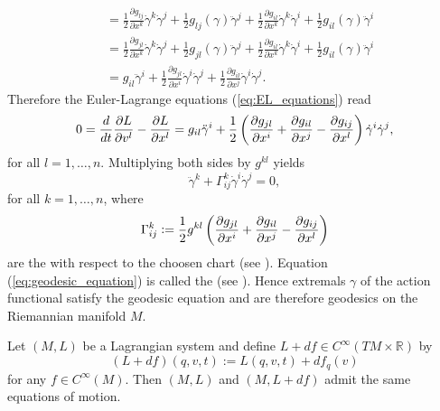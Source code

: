 \begin{example}
\begin{align*}
		&= \frac{1}{2}\frac{\partial g_{lj}}{\partial x^k}\dot{\gamma}^k\dot{\gamma}^j + \frac{1}{2}g_{lj}(\gamma)\ddot{\gamma}^j + \frac{1}{2}\frac{\partial g_{il}}{\partial x^k}\dot{\gamma}^k\dot{\gamma}^i + \frac{1}{2}g_{il}(\gamma)\ddot{\gamma}^i\\
		&= \frac{1}{2}\frac{\partial g_{jl}}{\partial x^k}\dot{\gamma}^k\dot{\gamma}^j + \frac{1}{2}g_{jl}(\gamma)\ddot{\gamma}^j + \frac{1}{2}\frac{\partial g_{il}}{\partial x^k}\dot{\gamma}^k\dot{\gamma}^i + \frac{1}{2}g_{il}(\gamma)\ddot{\gamma}^i\\
		&= g_{il}\ddot{\gamma}^i + \frac{1}{2}\frac{\partial g_{jl}}{\partial x^i}\dot{\gamma}^i\dot{\gamma}^j + \frac{1}{2}\frac{\partial g_{il}}{\partial x^j}\dot{\gamma}^i\dot{\gamma}^j.
	\end{align*}
	Therefore the Euler-Lagrange equations (\ref{eq:EL_equations}) read
	\begin{equation*}
		0 = \frac{d}{dt}\frac{\partial L}{\partial v^l} - \frac{\partial L}{\partial x^l} = g_{il}\ddot{\gamma}^i + \frac{1}{2}\del[3]{\frac{\partial g_{jl}}{\partial x^i} + \frac{\partial g_{il}}{\partial x^j} - \frac{\partial g_{ij}}{\partial x^l}}\dot{\gamma}^i\dot{\gamma}^j,	
	\end{equation*}
	\noindent for all $l = 1,\dots,n$. Multiplying both sides by $g^{kl}$ yields
	\begin{equation}
		\label{eq:geodesic_equation}
		\ddot{\gamma}^k + \Gamma^k_{ij}\dot{\gamma}^i \dot{\gamma}^j = 0,
	\end{equation}
	\noindent for all $k = 1,\dots,n$, where
	\begin{equation*}
		\Gamma^k_{ij} := \frac{1}{2}g^{kl}\del[3]{\frac{\partial g_{jl}}{\partial x^i} + \frac{\partial g_{il}}{\partial x^j} - \frac{\partial g_{ij}}{\partial x^l}}
	\end{equation*}
	\noindent are the  with respect to the choosen chart (see \cite[70]{lee:Riemannian_manifolds:1997}). Equation (\ref{eq:geodesic_equation}) is called the  (see \cite[58]{lee:Riemannian_manifolds:1997}). Hence extremals $\gamma$ of the action functional satisfy the geodesic equation and are therefore geodesics on the Riemannian manifold $M$.
\end{example}

\begin{lemma}
	\label{lem:same_equations_of_motion}
	Let $(M,L)$ be a Lagrangian system and define $L + df \in C^\infty(TM \times \mathbb{R})$ by
	\begin{equation*}
		(L + df)(q,v,t) := L(q,v,t) + df_q(v)
	\end{equation*}
	\noindent for any $f \in C^\infty(M)$. Then $(M,L)$ and $(M,L + df)$ admit the same equations of motion.
\end{lemma}

